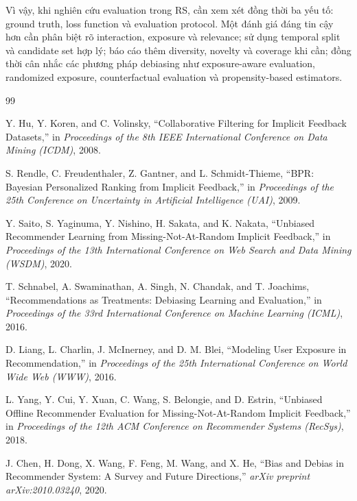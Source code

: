 \documentclass[12pt,a4paper]{article}
\begin{document}
Vì vậy, khi nghiên cứu evaluation trong RS, cần xem xét đồng thời ba yếu tố: ground truth, loss function và evaluation protocol. Một đánh giá đáng tin cậy hơn cần phân biệt rõ interaction, exposure và relevance; sử dụng temporal split và candidate set hợp lý; báo cáo thêm diversity, novelty và coverage khi cần; đồng thời cân nhắc các phương pháp debiasing như exposure-aware evaluation, randomized exposure, counterfactual evaluation và propensity-based estimators.

\begin{thebibliography}{99}

Y. Hu, Y. Koren, and C. Volinsky,
``Collaborative Filtering for Implicit Feedback Datasets,''
in \textit{Proceedings of the 8th IEEE International Conference on Data Mining (ICDM)}, 2008.

S. Rendle, C. Freudenthaler, Z. Gantner, and L. Schmidt-Thieme,
``BPR: Bayesian Personalized Ranking from Implicit Feedback,''
in \textit{Proceedings of the 25th Conference on Uncertainty in Artificial Intelligence (UAI)}, 2009.

Y. Saito, S. Yaginuma, Y. Nishino, H. Sakata, and K. Nakata,
``Unbiased Recommender Learning from Missing-Not-At-Random Implicit Feedback,''
in \textit{Proceedings of the 13th International Conference on Web Search and Data Mining (WSDM)}, 2020.

T. Schnabel, A. Swaminathan, A. Singh, N. Chandak, and T. Joachims,
``Recommendations as Treatments: Debiasing Learning and Evaluation,''
in \textit{Proceedings of the 33rd International Conference on Machine Learning (ICML)}, 2016.

D. Liang, L. Charlin, J. McInerney, and D. M. Blei,
``Modeling User Exposure in Recommendation,''
in \textit{Proceedings of the 25th International Conference on World Wide Web (WWW)}, 2016.

L. Yang, Y. Cui, Y. Xuan, C. Wang, S. Belongie, and D. Estrin,
``Unbiased Offline Recommender Evaluation for Missing-Not-At-Random Implicit Feedback,''
in \textit{Proceedings of the 12th ACM Conference on Recommender Systems (RecSys)}, 2018.

J. Chen, H. Dong, X. Wang, F. Feng, M. Wang, and X. He,
``Bias and Debias in Recommender System: A Survey and Future Directions,''
\textit{arXiv preprint arXiv:2010.03240}, 2020.

\end{thebibliography}
\end{document}

